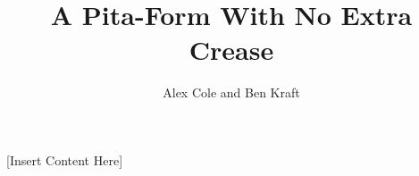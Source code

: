\documentclass[12pt]{article}
\title{A Pita-Form With No Extra Crease}
\author{Alex Cole and Ben Kraft}
\begin{document}
[Insert Content Here]
\end{document}
